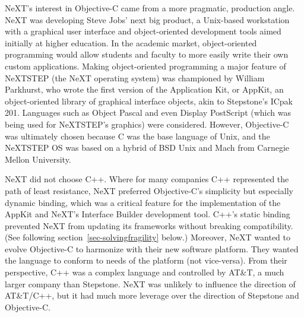 \documentclass[acmsmall,screen]{acmart}
\begin{document}
NeXT's interest in Objective-C came from a more pragmatic, production angle. NeXT was developing Steve Jobs' next big product, a Unix-based workstation with a graphical user interface and object-oriented development tools aimed initially at higher education. In the academic market, object-oriented programming would allow students and faculty to more easily write their own custom applications. Making object-oriented programming a major feature of NeXTSTEP (the NeXT operating system) was championed by William Parkhurst, who wrote the first version of the Application Kit, or AppKit, an object-oriented library of graphical interface objects, akin to Stepstone's ICpak 201. Languages such as Object Pascal and even Display PostScript (which was being used for NeXTSTEP's graphics) were considered. However, Objective-C was ultimately chosen because C was the base language of Unix, and the NeXTSTEP OS was based on a hybrid of BSD Unix and Mach from Carnegie Mellon University.

NeXT did not choose C++. Where for many companies C++ represented the path of least resistance, NeXT preferred Objective-C's simplicity but especially dynamic binding, which was a critical feature for the implementation of the AppKit and NeXT's Interface Builder development tool. C++'s static binding prevented NeXT from updating its frameworks without breaking compatibility. (See following section~\ref{sec-solvingfragility} below.) Moreover, NeXT wanted to evolve Objective-C to harmonize with their new software platform. They wanted the language to conform to needs of the platform (not vice-versa). From their perspective, C++ was a complex language and controlled by AT\&T, a much larger company than Stepstone. NeXT was unlikely to influence the direction of AT\&T/C++, but it had much more leverage over the direction of Stepstone and Objective-C. 

\addtocounter{appendixpagenum}{1}
\end{document}
